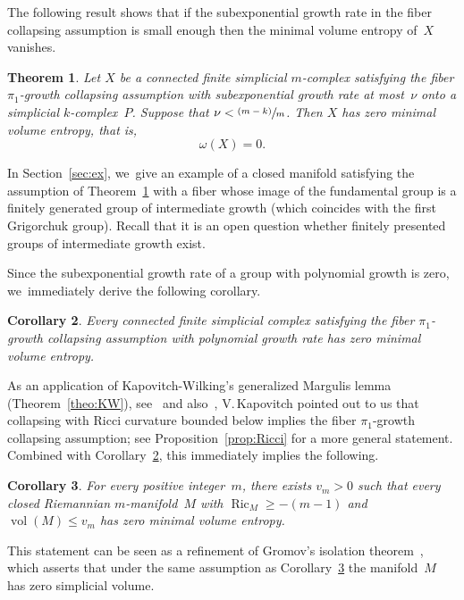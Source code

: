 \documentclass[11pt]{article}
\let\oldsfrac\sfrac
\renewcommand{\sfrac}[2]{{\oldsfrac{#1}{#2}}}
\newcommand{\psfrac}[2]{\sfrac{(#1)}{#2}}
\newtheorem{theorem}{Theorem}[section]
\newtheorem{corollary}[theorem]{Corollary}
\theoremstyle{definition}
\DeclareMathOperator{\Ric}{Ric}
\DeclareMathOperator{\vol}{vol}
\numberwithin{equation}{section}
\begin{document}
The following result shows that if the subexponential growth rate in the fiber collapsing assumption is small enough then the minimal volume entropy of~$X$ vanishes.

\begin{theorem} \label{theo:omega=0}
Let $X$ be a connected finite simplicial $m$\nobreakdash-complex satisfying the fiber $\pi_1$-growth collapsing assumption with subexponential growth rate at most~$\nu$ onto a simplicial $k$-complex~$P$.
Suppose that $\nu < \psfrac{m-k}{m}$.
Then $X$ has zero minimal volume entropy, that is,\vspace*{-5pt}
\[
\omega(X) = 0.
\]
\end{theorem}

In Section~\ref{sec:ex}, we~give an example of a closed manifold satisfying the assumption of Theorem~\ref{theo:omega=0} with a fiber whose image of the fundamental group is a finitely generated group of intermediate growth (which coincides with the first Grigorchuk group).
Recall that it is an open question whether finitely presented groups of intermediate growth exist.

Since the subexponential growth rate of a group with polynomial growth is zero, we~immediately derive the following corollary.

\begin{corollary} \label{coro:polynomial}
Every connected finite simplicial complex satisfying the fiber $\pi_1$\nobreakdash-growth collapsing assumption with polynomial growth rate has zero minimal volume entropy.
\end{corollary}

As an application of Kapovitch-Wilking's generalized Margulis lemma (Theorem~\ref{theo:KW}), see~\cite{KW} and also~\cite{courtois}, V.\,Kapovitch pointed out to us that collapsing with
Ricci curvature bounded below implies the fiber $\pi_1$-growth collapsing assumption; see Proposition~\ref{prop:Ricci} for a more general statement.
Combined with Corollary~\ref{coro:polynomial}, this immediately implies the following.

\begin{corollary} \label{coro:isolation}
For every positive integer~$m$, there exists $v_m>0$ such that every closed Riemannian $m$\nobreakdash-manifold~$M$ with $\Ric_M \geq -(m-1)$ and $\vol(M) \leq v_m$ has zero minimal volume entropy.
\end{corollary}

This statement can be seen as a refinement of Gromov's isolation theorem~\cite[\S0.5]{gro82}, which asserts that under the same assumption as Corollary~\ref{coro:isolation} the manifold~$M$ has zero simplicial volume.
\end{document}
